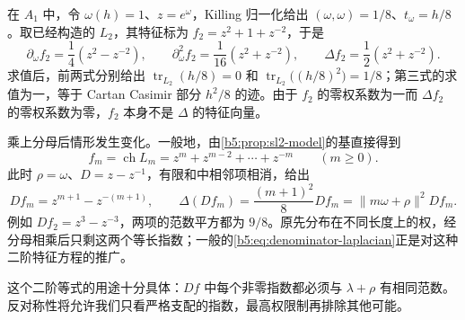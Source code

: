 在 \(A_1\) 中，令 \(\omega(h)=1\)、\(z=e^\omega\)，Killing 归一化给出 \((\omega,\omega)=1/8\)、\(t_\omega=h/8\)。取已经构造的 \(L_2\)，其特征标为 \(f_2=z^2+1+z^{-2}\)，于是
\[
	\partial_\omega f_2=\dfrac14(z^2-z^{-2}),\qquad \partial_\omega^2f_2=\dfrac1{16}(z^2+z^{-2}),\qquad \Delta f_2=\dfrac12(z^2+z^{-2}).
\]
求值后，前两式分别给出 \(\operatorname{tr}_{L_2}(h/8)=0\) 和 \(\operatorname{tr}_{L_2}\bigl((h/8)^2\bigr)=1/8\)；第三式的求值为一，等于 Cartan Casimir 部分 \(h^2/8\) 的迹。由于 \(f_2\) 的零权系数为一而 \(\Delta f_2\) 的零权系数为零，\(f_2\) 本身不是 \(\Delta\) 的特征向量。

\ProseParagraphBreak
乘上分母后情形发生变化。一般地，由\cref{b5:prop:sl2-model}的基直接得到
\[
	f_m=\operatorname{ch}L_m=z^m+z^{m-2}+\cdots+z^{-m} \qquad(m\ge0).
\]
此时 \(\rho=\omega\)、\(D=z-z^{-1}\)，有限和中相邻项相消，给出
\[
	Df_m=z^{m+1}-z^{-(m+1)},\qquad \Delta(Df_m)=\dfrac{(m+1)^2}{8}Df_m =\|m\omega+\rho\|^2Df_m.
\]
例如 \(Df_2=z^3-z^{-3}\)，两项的范数平方都为 \(9/8\)。原先分布在不同长度上的权，经分母相乘后只剩这两个等长指数；一般的\eqref{b5:eq:denominator-laplacian}正是对这种二阶特征方程的推广。

\ProseParagraphBreak
这个二阶等式的用途十分具体：\(Df\) 中每个非零指数都必须与 \(\lambda+\rho\) 有相同范数。反对称性将允许我们只看严格支配的指数，最高权限制再排除其他可能。
